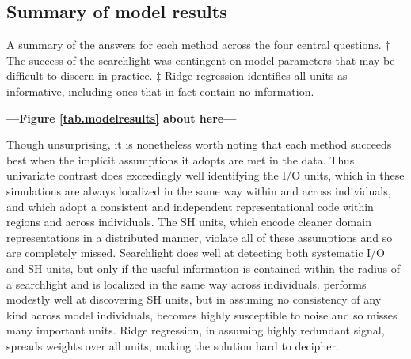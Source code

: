 \subsection{Summary of model results}
\begin{table}

\caption{A summary of the answers for each method across the four central questions. $\dagger$ The success of the searchlight was contingent on model parameters that may be difficult to discern in practice. $\ddagger$ Ridge regression identifies all units as informative, including ones that in fact contain no information.} 
\label{tab.modelresults}
\end{table}
\begin{center}
	\textbf{---Figure \ref{tab.modelresults} about here---}
\end{center}


Though unsurprising, it is nonetheless worth noting that each method succeeds best when the implicit assumptions it adopts are met in the data. Thus univariate contrast does exceedingly well identifying the I/O units, which in these simulations are always localized in the same way within and across individuals, and which adopt a consistent and independent representational code within regions and across individuals. The SH units, which encode cleaner domain representations in a distributed manner, violate all of these assumptions and so are completely missed. Searchlight does well at detecting both systematic I/O and SH units, but only if the useful information is contained within the radius of a searchlight and is localized in the same way across individuals. {\lasso} performs modestly well at discovering SH units, but in assuming no consistency of any kind across model individuals, becomes highly susceptible to noise and so misses many important units. Ridge regression, in assuming highly redundant signal, spreads weights over all units, making the solution hard to decipher.

